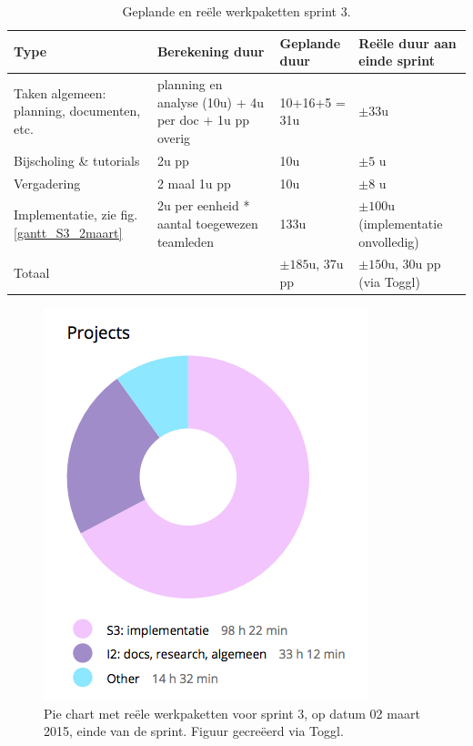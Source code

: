\documentclass{article}
\begin{document}
\begin{table}[!h] 
  \begin{center}
    \begin{tabular}{|p{4cm}|p{3cm}|p{3cm}|p{3cm}|} 
      \hline
       {\bf Type } &  {\bf Berekening duur} &  {\bf  Geplande duur} &   {\bf Re\"{e}le duur aan einde sprint} \\
           \hline
      Taken algemeen: planning, documenten, etc.& planning en analyse (10u)  + 4u per doc + 1u pp overig & 10+16+5 = 31u & $\pm 33$u  \\
         \hline
         Bijscholing \& tutorials & 2u pp & 10u & $\pm 5$ u \\
           \hline
         Vergadering & 2 maal 1u pp & 10u & $\pm 8$ u \\
         \hline
         Implementatie, zie fig. \ref{gantt_S3_2maart} & 2u per eenheid * aantal toegewezen teamleden & 133u & $\pm 100$u (implementatie onvolledig) \\
   \hline
       Totaal & &  $\pm 185$u,  37u pp & $\pm 150$u, 30u pp (via Toggl) \\
   \hline
    \end{tabular}
  \end{center}
  \caption{Geplande en re\"{e}le werkpaketten sprint 3.}
  \label{tabelS3}
 \end{table}


\begin{figure}[h!]
\centering
 \includegraphics[scale=0.6]{Toggl_Pie_S3.png}
 \caption{Pie chart met re\"{e}le werkpaketten voor sprint 3, op datum 02 maart 2015, einde van de sprint. Figuur gecre\"{e}erd via Toggl. }
 \label{pie_S3}
\end{figure}
\end{document}
